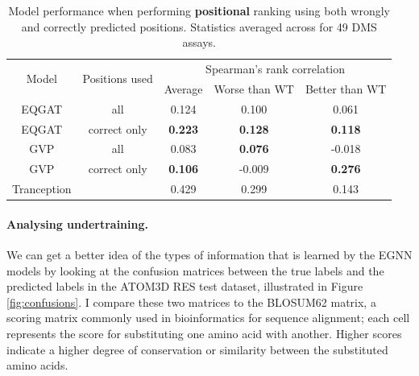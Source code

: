 \begin{table}[!hbt]
\caption{Model performance when performing \textbf{positional} ranking using both wrongly and correctly predicted positions. Statistics averaged across for 49 DMS assays.}
\label{ablation-correct-only-positional}
\vskip 0.15in
\begin{center}
\begin{small}
\begin{sc}
\begin{tabular}{@{}ccccc@{}}
\toprule
\multirow{2}{*}{Model} & \multirow{2}{*}{Positions used} & \multicolumn{3}{c}{Spearman's rank correlation}             \\ \cmidrule(l){3-5} 
                       &                                 & Average        & Worse than WT & Better than WT \\ \midrule
EQGAT                  & all                             & 0.124          & 0.100               & 0.061                \\
EQGAT                  & correct only                    & \textbf{0.223} & \textbf{0.128}      & \textbf{0.118}       \\ \midrule
GVP                    & all                             & 0.083          & \textbf{0.076}      & -0.018               \\
GVP                    & correct only                    & \textbf{0.106} & -0.009              & \textbf{0.276}       \\ \midrule
Tranception            &                                 & 0.429          & 0.299               & 0.143                \\ \bottomrule
\end{tabular}
\end{sc}
\end{small}
\end{center}
\vskip -0.1in
\end{table}

\paragraph{Analysing undertraining.}
We can get a better idea of the types of information that is learned by the EGNN models by looking at the confusion matrices between the true labels and the predicted labels in the ATOM3D RES test dataset, illustrated in Figure \ref{fig:confusions}. I compare these two matrices to the BLOSUM62 matrix, a scoring matrix commonly used in bioinformatics for sequence alignment; each cell represents the score for substituting one amino acid with another. Higher scores indicate a higher degree of conservation or similarity between the substituted amino acids.

